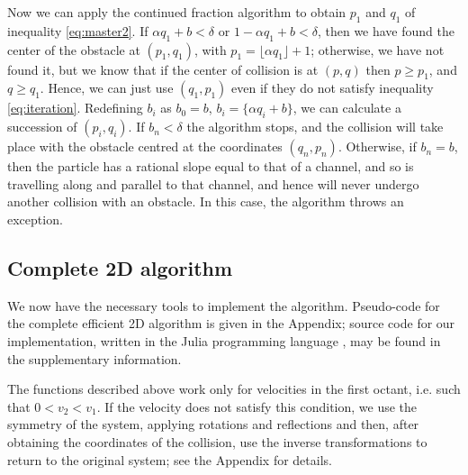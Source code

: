 \documentclass[pre,amsmath,amssymb, twocolumn, showpacs]{revtex4-1}
\begin{document}
Now we can apply the continued fraction algorithm to obtain $p_1$ and $q_1$ of inequality \eqref{eq:master2}.  If ${\alpha q_1+b} < \delta$ or $1-{\alpha q_1+b} < \delta$, then we have found the center of the obstacle at $(p_1,q_1)$, with  $p_1=\lfloor \alpha q_1  \rfloor+1$; otherwise, we have not found it, but we know that if the center of collision is at $(p,q)$ then
$p\geq p_1$, and $q \geq q_1$. Hence, we can just use $(q_1,p_1)$ even if they do not satisfy inequality \eqref{eq:iteration}. Redefining $b_i$ as $b_0=b$, $b_i=\{\alpha q_i+b\}$, we can calculate a succession of $(p_i,q_i)$. If $b_n<\delta$ the algorithm stops, and the collision will take place with the obstacle centred at the coordinates $(q_n,p_n)$.
Otherwise, if $b_n = b$, then the particle has a rational slope equal to that of a channel, and so is travelling along and parallel to that channel, and hence will never undergo another collision with an obstacle. In this case, the algorithm throws an exception.


\subsection{Complete 2D algorithm}

We now have the necessary tools to implement the algorithm. Pseudo-code for the complete efficient 2D algorithm is given in the Appendix;  source code for our implementation, written in the Julia programming language
\cite{JuliaLang, JuliaArticle},
may be found in the supplementary information.

The functions described above work only for velocities in the first octant, i.e. such that $0 < v_{2} < v_{1}$. If the velocity does not satisfy this condition, we use the symmetry of the system, applying rotations and reflections and then, after obtaining the 
coordinates of the collision, use the inverse transformations to return to the original system; see the Appendix for details.
%
\end{document}
